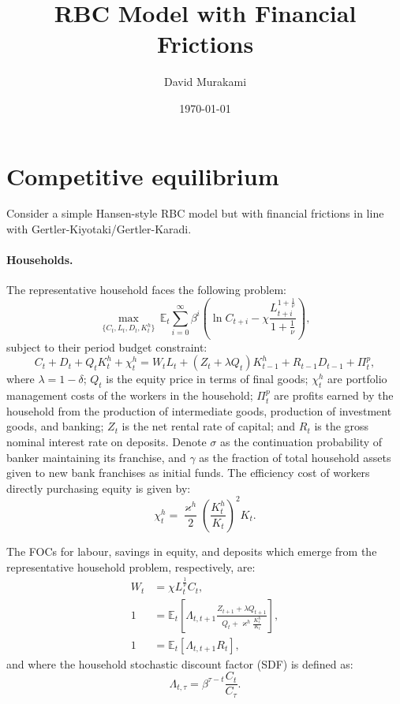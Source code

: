 \documentclass[12pt,english]{extarticle}
\title{\textbf{RBC Model with Financial Frictions}}
\author{David Murakami}
\date{\today}
\newcommand{\E}{\mathbb{E}}
\begin{document}
	\maketitle
	
	\section*{Competitive equilibrium}
	\label{sec: RBC model with financial frictions}
	Consider a simple Hansen-style RBC model but with financial frictions in line with Gertler-Kiyotaki/Gertler-Karadi. 
	
	\paragraph{Households.} The representative household faces the following problem:
	\begin{equation*}
		\max_{\{C_t,L_t,D_t,K_t^h\}} \, \mathbb{E}_t\sum_{i=0}^\infty\beta^i\left(\ln C_{t+i} - \chi\frac{L_{t+i}^{1+\frac{1}{\nu}}}{1+\frac{1}{\nu}}\right),
	\end{equation*}
	subject to their period budget constraint:
	\begin{equation*}
		C_t + D_t + Q_tK_t^h + \chi_t^h = W_tL_t + (Z_t + \lambda Q_t)K_{t-1}^h + R_{t-1}D_{t-1} + \Pi_t^p,
	\end{equation*}	
	where $\lambda=1-\delta$; $Q_t$ is the equity price in terms of final goods; $\chi_t^h$ are portfolio management costs of the workers in the household; $\Pi_t^p$ are profits earned by the household from the production of intermediate goods, production of investment goods, and banking; $Z_t$ is the net rental rate of capital; and $R_t$ is the gross nominal interest rate on deposits. Denote $\sigma$ as the continuation probability of banker maintaining its franchise, and $\gamma$ as the fraction of total household assets given to new bank franchises as initial funds. The efficiency cost of workers directly purchasing equity is given by:
	\begin{equation*}
		\chi_{t}^{h} = \frac{\varkappa^h}{2}\left(\frac{K_{t}^{h}}{K_{t}}\right)^2 K_{t}.
	\end{equation*}
	
	The FOCs for labour, savings in equity, and deposits which emerge from the representative household problem, respectively, are:
	\begin{align}
		\label{eq: intratemporal Euler equation, RBC-GK}
		W_t &= \chi L_t^{\frac{1}{\nu}}C_t, \\
		\label{eq: household FOC wrt equity}
		1 &= \E_{t}\left[ \Lambda_{t,t+1}\frac{Z_{t+1} + \lambda Q_{t+1}}{Q_{t} + \varkappa^{h}\frac{K_{t}^{h}}{K_{t}}}\right], \\
		\label{eq:household FOC wrt deposits}
		1 &= \E_{t}\left[ \Lambda_{t,t+1}R_t \right],
	\end{align}
	and where the household stochastic discount factor (SDF) is defined as:
	\begin{equation*}
		\Lambda_{t,\tau} = \beta^{\tau-t}\frac{C_t}{C_{\tau}}.
	\end{equation*}
	
\end{document}
